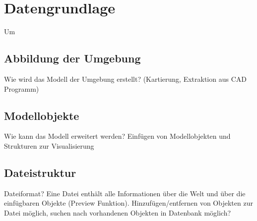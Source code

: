 \chapter{Datengrundlage}
\label{chap:datengrundlage}
Um

\section{Abbildung der Umgebung}
Wie wird das Modell der Umgebung erstellt? (Kartierung, Extraktion aus CAD Programm)\\

\section{Modellobjekte}
Wie kann das Modell erweitert werden? Einfügen von Modellobjekten und Strukturen zur Visualisierung\\

\section{Dateistruktur}
Dateiformat? Eine Datei enthält alle Informationen über die Welt und über die einfügbaren Objekte (Preview Funktion). Hinzufügen/entfernen von Objekten zur Datei möglich, suchen nach vorhandenen Objekten in Datenbank möglich?



